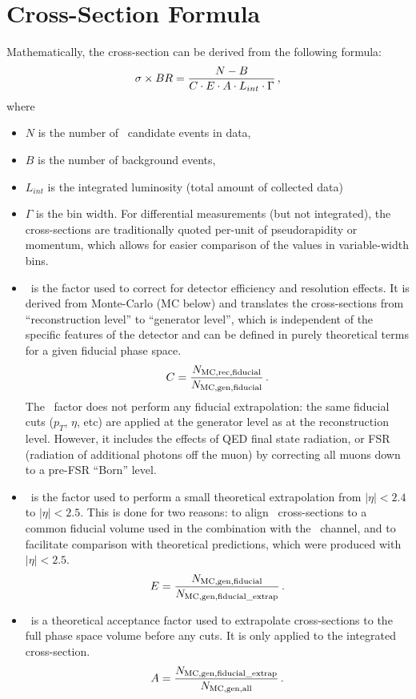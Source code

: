 \section{Cross-Section Formula}
\label{sec:xsec_formula}
Mathematically, the cross-section can be derived from the following formula:
\begin{equation}
 \sigma \times BR =
 \frac{N - B}{C \cdot E \cdot A \cdot L_{int}  \cdot \Gamma} \,,
\label{eq:WZxsec}
\end{equation}
where
\begin{itemize}
\item $N$ is the number of \Wboson\ candidate events in data,
\item $B$ is the number of background events,
\item $L_{int}$ is the integrated luminosity (total amount of collected data)
\item $\Gamma$ is the bin width. For differential measurements (but not integrated), the cross-sections are traditionally quoted per-unit of pseudorapidity or momentum, which allows for easier comparison of the values in variable-width bins.
\item \C\ is the factor used to correct for detector efficiency and resolution effects. It is derived from Monte-Carlo (MC below) and translates the cross-sections from ``reconstruction level'' to ``generator level'', which is independent of the specific features of the detector and can be defined in purely theoretical terms for a given fiducial phase space. 
    \begin{equation}
      C = \frac{N_\mathrm{MC, rec, fiducial}}{N_\mathrm{MC, gen, fiducial}}\,. \label{eq:c}
    \end{equation}
 The \C\ factor does not perform any fiducial extrapolation: the same fiducial cuts ($p_T$, $\eta$, etc) are applied at the generator level as at the reconstruction level. However, it includes the effects of QED final state radiation, or FSR (radiation of additional photons off the muon) by correcting all muons down to a pre-FSR ``Born'' level.
\item \E\ is the factor used to perform a small theoretical extrapolation from $|\eta|<2.4$ to $|\eta|<2.5$. This is done for two reasons: to align \Wmn\ cross-sections to a common fiducial volume used in the combination with the \Wen\ channel, and to facilitate comparison with theoretical predictions, which were produced with $|\eta|<2.5$.
    \begin{equation}
      E = \frac{N_\mathrm{MC, gen, fiducial}}{N_\mathrm{MC, gen, fiducial\_extrap}}\,.
    \end{equation}
\item \A\ is a theoretical acceptance factor used to extrapolate cross-sections to the full phase space volume before any cuts. It is only applied to the integrated cross-section.
    \begin{equation}
      A = \frac{N_\mathrm{MC, gen, fiducial\_extrap}}{N_\mathrm{MC, gen, all}}\,.
    \end{equation}
\end{itemize}

